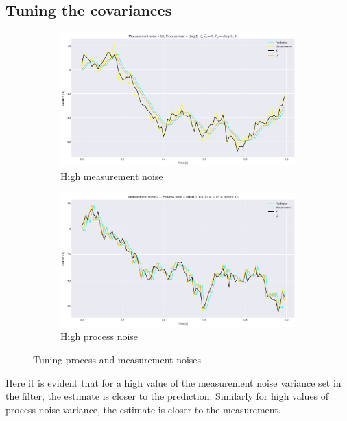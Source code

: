 \documentclass[11pt]{article}
\begin{document}
\subsection*{Tuning the covariances}
\begin{figure}[H]
    \centering
    \begin{subfigure}[H]{0.49\linewidth}
        \includegraphics[width=\linewidth]{../kfcov1.png}
        \caption*{High measurement noise}
    \end{subfigure}
    \begin{subfigure}[H]{0.49\linewidth}
        \includegraphics[width=\linewidth]{../kfcov2.png}
        \caption*{High process noise}
    \end{subfigure}
    \caption*{Tuning process and measurement noises}
\end{figure}
Here it is evident that for a high value of the measurement noise variance set in the filter, the estimate is closer to the prediction. 
Similarly for high values of process noise variance, the estimate is closer to the measurement. 
\end{document}
